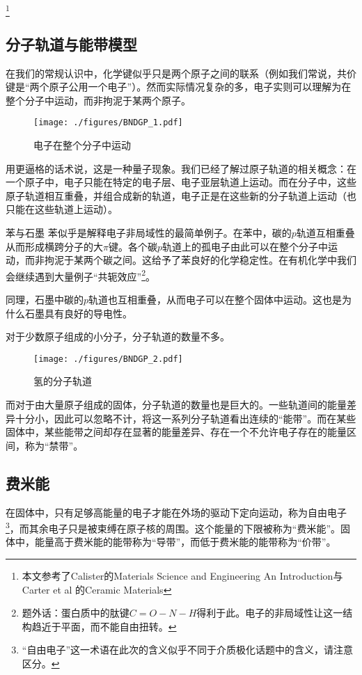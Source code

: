 
\begin{issues}
\issueDraft
\end{issues}


\footnote{本文参考了Calister的Materials Science and Engineering An Introduction与Carter et al 的Ceramic Materials}
\subsection{分子轨道与能带模型}
在我们的常规认识中，化学键似乎只是两个原子之间的联系（例如我们常说，共价键是“两个原子公用一个电子”）。然而实际情况复杂的多，电子实则可以理解为在整个分子中运动，而非拘泥于某两个原子。
\begin{figure}[ht]
\centering
\texttt{[image: ./figures/BNDGP\_1.pdf]}
\caption{电子在整个分子中运动} \label{BNDGP_fig1}
\end{figure}
用更逼格的话术说，这是一种量子现象。我们已经了解过原子轨道的相关概念：在一个原子中，电子只能在特定的电子层、电子亚层轨道上运动。而在分子中，这些原子轨道相互重叠，并组合成新的轨道，电子正是在这些新的分子轨道上运动（也只能在这些轨道上运动）。

\begin{example}{苯与石墨}
苯似乎是解释电子非局域性的最简单例子。在苯中，碳的$p$轨道互相重叠从而形成横跨分子的大$\pi$键。各个碳$p$轨道上的孤电子由此可以在整个分子中运动，而非拘泥于某两个碳之间。这给予了苯良好的化学稳定性。在有机化学中我们会继续遇到大量例子“共轭效应”\footnote{题外话：蛋白质中的肽键$C=O-N-H$得利于此。电子的非局域性让这一结构趋近于平面，而不能自由扭转。}。

同理，石墨中碳的$p$轨道也互相重叠，从而电子可以在整个固体中运动。这也是为什么石墨具有良好的导电性。
\end{example}

对于少数原子组成的小分子，分子轨道的数量不多。
\begin{figure}[ht]
\centering
\texttt{[image: ./figures/BNDGP\_2.pdf]}
\caption{氢的分子轨道} \label{BNDGP_fig2}
\end{figure}
而对于由大量原子组成的固体，分子轨道的数量也是巨大的。一些轨道间的能量差异十分小，因此可以忽略不计，将这一系列分子轨道看出连续的“能带”。而在某些固体中，某些能带之间却存在显著的能量差异、存在一个不允许电子存在的能量区间，称为“禁带”。

\subsection{费米能}
在固体中，只有足够高能量的电子才能在外场的驱动下定向运动，称为自由电子\footnote{“自由电子”这一术语在此次的含义似乎不同于介质极化话题中的含义，请注意区分。}，而其余电子只是被束缚在原子核的周围。这个能量的下限被称为“费米能”。固体中，能量高于费米能的能带称为“导带”，而低于费米能的能带称为“价带”。


